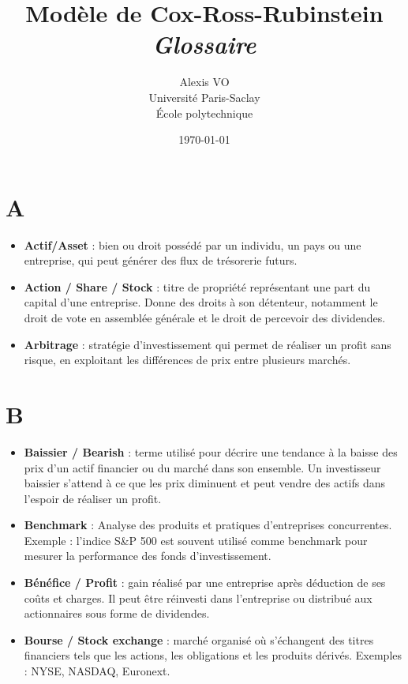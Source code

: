 \documentclass[a4paper,10pt]{article}
\title{\Huge{\textbf{Modèle de Cox-Ross-Rubinstein}}\\ \medskip
      \Huge{\textit{Glossaire}}\vspace*{0.7cm}}
\author{\LARGE{Alexis VO}\vspace{1cm}\\ \medskip
      Université Paris-Saclay\\École polytechnique}
\date{\vspace{0.2cm}\today}
\begin{document}
\vspace{\fill}
  \maketitle
\vspace{\fill}

\newpage

\tableofcontents

\newpage

\begin{multicols}{2}

\section*{A}
\begin{itemize}
  \item \textbf{Actif/Asset} : bien ou droit possédé par un individu, un pays ou une entreprise, qui peut générer des flux de trésorerie futurs.
  \item \textbf{Action / Share / Stock} : titre de propriété représentant une part du capital d’une entreprise. Donne des droits à son détenteur, notamment le droit de vote en assemblée générale et le droit de percevoir des dividendes.
  \item \textbf{Arbitrage} : stratégie d’investissement qui permet de réaliser un profit sans risque, en exploitant les différences de prix entre plusieurs marchés.
\end{itemize}

\section*{B}
\begin{itemize}
  \item \textbf{Baissier / Bearish} : terme utilisé pour décrire une tendance à la baisse des prix d’un actif financier ou du marché dans son ensemble. Un investisseur baissier s’attend à ce que les prix diminuent et peut vendre des actifs dans l’espoir de réaliser un profit.
  \item \textbf{Benchmark} : Analyse des produits et pratiques d'entreprises concurrentes. Exemple : l'indice S\&P 500 est souvent utilisé comme benchmark pour mesurer la performance des fonds d'investissement.
  \item \textbf{Bénéfice / Profit} : gain réalisé par une entreprise après déduction de ses coûts et charges. Il peut être réinvesti dans l’entreprise ou distribué aux actionnaires sous forme de dividendes.
  \item \textbf{Bourse / Stock exchange} : marché organisé où s’échangent des titres financiers tels que les actions, les obligations et les produits dérivés. Exemples : NYSE, NASDAQ, Euronext.
\end{itemize}


\end{multicols}
\end{document}
